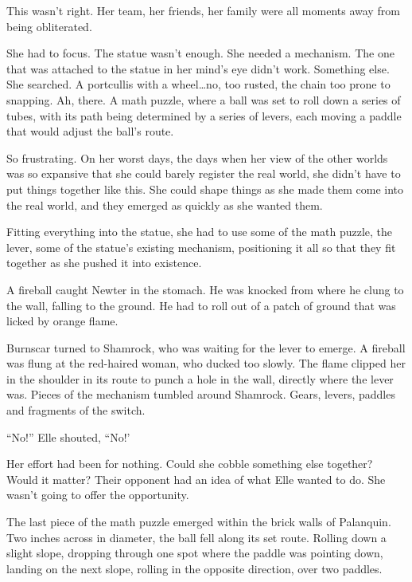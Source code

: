 This wasn't right.  Her team, her friends, her family were all moments away from being obliterated.



She had to focus.  The statue wasn't enough.  She needed a mechanism.  The one that was attached to the statue in her mind's eye didn't work.  Something else.  She searched. A portcullis with a wheel\ldots no, too rusted, the chain too prone to snapping.  Ah, there.  A math puzzle, where a ball was set to roll down a series of tubes, with its path being determined by a series of levers, each moving a paddle that would adjust the ball's route.



So frustrating.  On her worst days, the days when her view of the other worlds was so expansive that she could barely register the real world, she didn't have to put things together like this.  She could shape things as she made them come into the real world, and they emerged as quickly as she wanted them.



Fitting everything into the statue, she had to use some of the math puzzle, the lever, some of the statue's existing mechanism, positioning it all so that they fit together as she pushed it into existence.



A fireball caught Newter in the stomach.  He was knocked from where he clung to the wall, falling to the ground.  He had to roll out of a patch of ground that was licked by orange flame.



Burnscar turned to Shamrock, who was waiting for the lever to emerge.  A fireball was flung at the red-haired woman, who ducked too slowly.  The flame clipped her in the shoulder in its route to punch a hole in the wall, directly where the lever was.  Pieces of the mechanism tumbled around Shamrock.  Gears, levers, paddles and fragments of the switch.



``No!''  Elle shouted, ``No!'



Her effort had been for nothing.  Could she cobble something else together?  Would it matter?  Their opponent had an idea of what Elle wanted to do.  She wasn't going to offer the opportunity.



The last piece of the math puzzle emerged within the brick walls of Palanquin.  Two inches across in diameter, the ball fell along its set route.  Rolling down a slight slope, dropping through one spot where the paddle was pointing down, landing on the next slope, rolling in the opposite direction, over two paddles.



